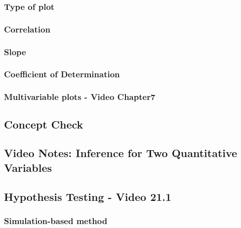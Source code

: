 \documentclass[
]{report}
\begin{document}
\subsubsection*{Type of plot}\label{type-of-plot}

\subsubsection*{Correlation}\label{correlation}

\subsubsection*{Slope}\label{slope}

\subsubsection*{Coefficient of Determination}\label{coefficient-of-determination}

\subsubsection*{Multivariable plots - Video Chapter7}\label{multivariable-plots---video-chapter7}

\subsection{Concept Check}\label{concept-check-11}

\subsection{Video Notes: Inference for Two Quantitative Variables}\label{video-notes-inference-for-two-quantitative-variables}

\subsection*{Hypothesis Testing - Video 21.1}\label{hypothesis-testing---video-21.1}

\subsubsection*{Simulation-based method}\label{simulation-based-method-9}
\end{document}

